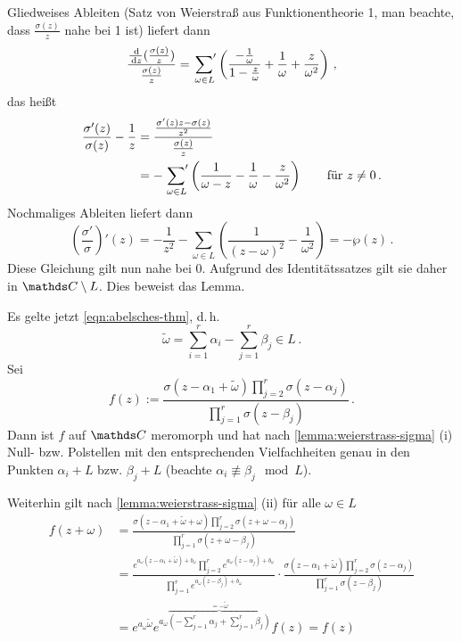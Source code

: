 \begin{bewe}
\begin{bewe-list}
Gliedweises Ableiten (Satz von Weierstraß aus Funktionentheorie 1, man beachte, dass $\frac{\sigma(z)}{z}$ nahe bei 1 ist) liefert dann
\[
	\frac{\derive (\frac{\sigma(z)}{z})}{\frac{\sigma(z)}{z}}
	= \sumprime_{\omega \in L} \left(\frac{-\frac{1}{\omega}}{1-\frac{z}{\omega}} + \frac{1}{\omega} + \frac{z}{\omega^2}\right)
	\,,
\]
das heißt
\begin{align*}
	\frac{\sigma'(z)}{\sigma(z)} - \frac{1}{z}
	&= \frac{\frac{\sigma'(z)z-\sigma(z)}{z^2}}{\frac{\sigma(z)}{z}} \\
	&= - \sumprime_{\omega\in L} \left( \frac{1}{\omega-z} - \frac{1}{\omega} - \frac{z}{\omega^2} \right)
	\qquad \text{für } z \not= 0
	\,.
\end{align*}
Nochmaliges Ableiten liefert dann
\[
	\left(\frac{\sigma'}{\sigma}\right)'(z)
	= -\frac{1}{z^2} - \sum_{\omega\in L} \left(\frac{1}{(z-\omega)^2} - \frac{1}{\omega^2}\right)
	= -\wp(z)
	\,.
\]
Diese Gleichung gilt nun nahe bei 0.
Aufgrund des Identitätssatzes gilt sie daher in $\CC\setminus L$.
Dies beweist das Lemma.
\end{bewe-list}

Es gelte jetzt \eqref{eqn:abelsches-thm}, d.\,h.
\[
	\tilde \omega = \sum_{i=1}^r \alpha_i - \sum_{j=1}^r \beta_j \in L
	\,.
\]
Sei
\[
	f(z)
	:= \frac{\sigma(z-\alpha_1+\tilde\omega) \prod_{j=2}^r \sigma(z-\alpha_j)}{\prod_{j=1}^r \sigma(z-\beta_j)}
	\,.
\]
Dann ist $f$ auf $\CC$ meromorph und hat nach \autoref{lemma:weierstrass-sigma} (i) Null- bzw. Polstellen mit den entsprechenden Vielfachheiten genau in den Punkten $\alpha_i + L$ bzw. $\beta_j + L$ (beachte $\alpha_i \not\equiv \beta_j \mod L$).

Weiterhin gilt nach \autoref{lemma:weierstrass-sigma} (ii) für alle $\omega \in L$
\begin{align*}
	f(z + \omega)
	&= \frac{\sigma(z-\alpha_1+\tilde\omega+\omega) \prod_{j=2}^r \sigma(z+\omega-\alpha_j)}{\prod_{j=1}^r \sigma(z+\omega-\beta_j)} \\
	&= \frac{e^{a_\omega(z-\alpha_1+\tilde\omega) + b_\omega} \prod_{j=2}^r e^{a_\omega(z-\alpha_j)+ b_\omega}}{\prod_{j=1}^r e^{a_\omega(z-\beta_j) + b_\omega}}
	\cdot \frac{\sigma(z-\alpha_1 + \tilde\omega) \prod_{j=2}^r \sigma(z-\alpha_j)}{\prod_{j=1}^r \sigma(z-\beta_j)} \\
	&= e^{a_\omega \tilde\omega} e^{a_\omega \overbrace{\scriptstyle (-\sum_{j=1}^r \alpha_j + \sum_{j=1}^r \beta_j)}^{=-\tilde\omega}} f(z)
	= f(z)
\end{align*}
\end{bewe}